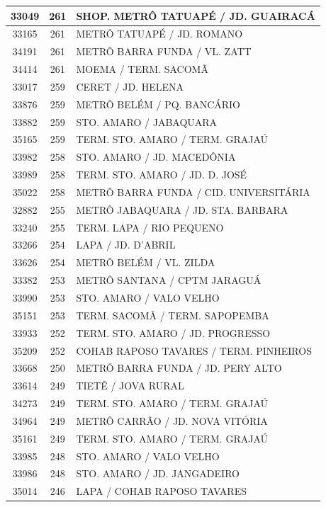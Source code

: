 \documentclass[
	12pt,				%
	oneside,			%
	a4paper,			%
	english,			%
	brazil				%
	]{abntex2ppgsi}
\begin{document}
{{{\begin{apendicesenv}
\begin{longtable}{c|c|p{7cm}}
 \hline 
33049 &	261 &	SHOP. METRÔ TATUAPÉ / JD. GUAIRACÁ \\ 
 \hline 
33165 &	261 &	METRÔ TATUAPÉ / JD. ROMANO \\ 
 \hline 
34191 &	261 &	METRÔ BARRA FUNDA / VL. ZATT \\ 
 \hline 
34414 &	261 &	MOEMA / TERM. SACOMÃ \\ 
 \hline 
33017 &	259 &	CERET / JD. HELENA \\ 
 \hline 
33876 &	259 &	METRÔ BELÉM / PQ. BANCÁRIO \\ 
 \hline 
33882 &	259 &	STO. AMARO / JABAQUARA \\ 
 \hline 
35165 &	259 &	TERM. STO. AMARO / TERM. GRAJAÚ \\ 
 \hline 
33982 &	258 &	STO. AMARO / JD. MACEDÔNIA \\ 
 \hline 
33989 &	258 &	TERM. STO. AMARO / JD. D. JOSÉ \\ 
 \hline 
35022 &	258 &	METRÔ BARRA FUNDA / CID. UNIVERSITÁRIA \\ 
 \hline 
32882 &	255 &	METRÔ JABAQUARA / JD. STA. BARBARA \\ 
 \hline 
33240 &	255 &	TERM. LAPA / RIO PEQUENO \\ 
 \hline 
33266 &	254 &	LAPA / JD. D'ABRIL \\ 
 \hline 
33626 &	254 &	METRÔ BELÉM / VL. ZILDA \\ 
 \hline 
33382 &	253 &	METRÔ SANTANA / CPTM JARAGUÁ \\ 
 \hline 
33990 &	253 &	STO. AMARO / VALO VELHO \\ 
 \hline 
35151 &	253 &	TERM. SACOMÃ / TERM. SAPOPEMBA \\ 
 \hline 
33933 &	252 &	TERM. STO. AMARO / JD. PROGRESSO \\ 
 \hline 
35209 &	252 &	COHAB RAPOSO TAVARES / TERM. PINHEIROS \\ 
 \hline 
33668 &	250 &	METRÔ BARRA FUNDA / JD. PERY ALTO \\ 
 \hline 
33614 &	249 &	TIETÊ / JOVA RURAL \\ 
 \hline 
34273 &	249 &	TERM. STO. AMARO / TERM. GRAJAÚ \\ 
 \hline 
34964 &	249 &	METRÔ CARRÃO / JD. NOVA VITÓRIA \\ 
 \hline 
35161 &	249 &	TERM. STO. AMARO / TERM. GRAJAÚ \\ 
 \hline 
33985 &	248 &	STO. AMARO / VALO VELHO \\ 
 \hline 
33986 &	248 &	STO. AMARO / JD. JANGADEIRO \\ 
 \hline 
35014 &	246 &	LAPA / COHAB RAPOSO TAVARES \\ 

\end{longtable}
\end{apendicesenv}}}}
\end{document}
